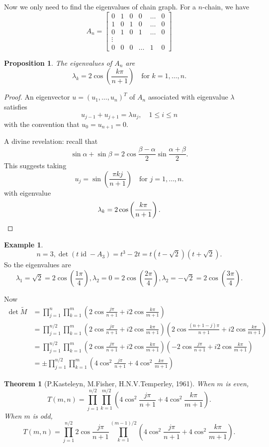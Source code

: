 \documentclass{report}
\def \id {\operatorname{id}}
\newtheorem{theorem}{Theorem}[section]
\newtheorem{proposition}{Proposition}[section]
\theoremstyle{definition}
\newtheorem{example}{Example}[section]
\theoremstyle{remark}
\numberwithin{equation}{section}
\begin{document}
Now we only need to find the eigenvalues of chain graph. For a $n$-chain, we have
\[
A_n = \begin{bmatrix}
0 & 1 & 0 & 0 & \ldots & 0 \\
1 & 0 & 1 & 0 & \ldots & 0 \\
0 & 1 & 0 & 1 & \ldots & 0 \\
\vdots \\
0 & 0 & 0 & \ldots & 1 & 0
\end{bmatrix}
\]
\begin{proposition}\label{prop:divine}
The eigenvalues of $A_n$ are 
\[
\lambda_k = 2 \cos\left(\frac{k\pi}{n+1}\right)\quad \text{for } k = 1, \ldots, n.
\]
\end{proposition}
\begin{proof}
An eigenvector $u = (u_1, \ldots, u_n)^T$ of $A_n$ associated with eigenvalue $\lambda$ satisfies
\[
u_{j-1}+u_{j+1} = \lambda u_j, \quad 1 \leq i \leq n
\]
with the convention that $u_0 = u_{n+1} = 0$.


A divine revelation:
recall that \[\sin\alpha + \sin\beta = 2\cos\frac{\beta - \alpha}{2}\sin\frac{\alpha+\beta}{2}.\]
This suggests taking
\[
u_j = \sin\left(\frac{\pi k j}{n + 1}\right) \quad \text{for } j = 1, \ldots, n.
\]
with eigenvalue 
\[
\lambda_k = 2 \cos\left(\frac{k\pi}{n+1}\right). \qedhere
\]
\end{proof}
\begin{example}
\[n = 3, \det(t\id - A_3) = t^3 - 2t = t(t - \sqrt{2})(t + \sqrt{2}).\]
So the eigenvalues are 
\[
\lambda_1 = \sqrt{2} = 2\cos\left(\frac{1\pi}{4}\right), \lambda_2 = 0 = 2\cos\left(\frac{2\pi}{4}\right), \lambda_2 = -\sqrt{2} = 2\cos\left(\frac{3\pi}{4}\right).
\]
\end{example}
Now
\begin{align*}
\det\tilde{M} & = \prod_{j=1}^n\prod_{k=1}^m \left(2\cos\frac{j\pi}{n+1} + i2\cos\frac{k\pi}{m+1}\right) \\ & = \prod_{j=1}^{n/2}\prod_{k=1}^m \left(2\cos\frac{j\pi}{n+1} + i2\cos\frac{k\pi}{m+1}\right)\left(2\cos\frac{(n+1-j)\pi}{n+1} + i2\cos\frac{k\pi}{m+1}\right) \\
& = \prod_{j=1}^{n/2}\prod_{k=1}^m \left(2\cos\frac{j\pi}{n+1} + i2\cos\frac{k\pi}{m+1}\right)\left(-2\cos\frac{j\pi}{n+1} + i2\cos\frac{k\pi}{m+1}\right) \\
& = \pm\prod_{j=1}^{n/2}\prod_{k=1}^m \left(4\cos^2\frac{j\pi}{n+1} + 4\cos^2\frac{k\pi}{m+1}\right)
\end{align*}

\begin{theorem}[P.Kasteleyn, M.Fisher, H.N.V.Temperley, 1961]
When $m$ is even,
\[
T(m, n) = \prod_{j=1}^{n/2}\prod_{k=1}^{m/2} \left(4\cos^2\frac{j\pi}{n+1} + 4\cos^2\frac{k\pi}{m+1}\right).
\]
When $m$ is odd,
\[
T(m, n) = \prod_{j=1}^{n/2}2\cos\frac{j\pi}{n+1}\prod_{k=1}^{(m-1)/2} \left(4\cos^2\frac{j\pi}{n+1} + 4\cos^2\frac{k\pi}{m+1}\right).
\]
\end{theorem}
\end{document}
